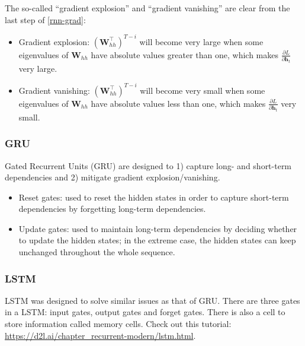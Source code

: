 The so-called ``gradient explosion'' and ``gradient vanishing'' are clear from the last step of \eqref{rnn-grad}:
    \begin{itemize}
        \item Gradient explosion: $\left(\bm{W}_{hh}^\top \right)^{T-i}$ will become 
        very large when some eigenvalues of $\bm{W}_{hh}$ have absolute values greater than one, which makes $\frac{\partial L}{\partial \bm{h}_t}$ very large.
        \item Gradient vanishing: $\left(\bm{W}_{hh}^\top \right)^{T-i}$ will become very small when some eigenvalues of $\bm{W}_{hh}$ have absolute values less than one, which makes $\frac{\partial L}{\partial \bm{h}_t}$ very small.
    \end{itemize}
    
\subsubsection{GRU}
    Gated Recurrent Units (GRU) are designed to 1) capture long- and short-term dependencies and 2) mitigate gradient explosion/vanishing.
    \begin{itemize}
        \item Reset gates: used to reset the hidden states in order to capture short-term dependencies by forgetting long-term dependencies.
        \item Update gates: used to maintain long-term dependencies by deciding whether to update the hidden states; in the extreme case, the hidden states can keep unchanged throughout the whole sequence.
    \end{itemize}
    
\subsubsection{LSTM}
    LSTM was designed to solve similar issues as that of GRU.
    There are three gates in a LSTM: input gates, output gates and forget gates. 
    There is also a cell to store information called memory cells.
    Check out this tutorial: \url{https://d2l.ai/chapter_recurrent-modern/lstm.html}.